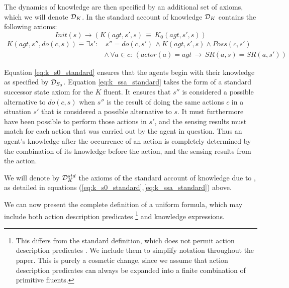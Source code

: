 The dynamics of knowledge are then specified by an additional set
of axioms, which we will denote $\mathcal{D}_{K}$. In the standard account
of knowledge $\mathcal{D}_{K}$ contains the following axioms:\begin{equation}
Init(s)\rightarrow\left(K(agt,s',s)\,\equiv\, K_{0}(agt,s',s)\right)\label{eq:k_s0_standard}\end{equation}
 \begin{align}
K(agt,s'',do(c,s))\equiv\exists s': & \, s''=do(c,s')\,\wedge K(agt,s',s)\wedge Poss(c,s')\nonumber \\
 & \wedge\,\forall a\in c:\,\left(actor(a)=agt\,\rightarrow\, SR(a,s)=SR(a,s')\right)\label{eq:k_ssa_standard}\end{align}


Equation \eqref{eq:k_s0_standard} ensures that the agents begin with
their knowledge as specified by $\mathcal{D}_{S_{0}}$. Equation \eqref{eq:k_ssa_standard}
takes the form of a standard successor state axiom for the $K$ fluent.
It ensures that $s''$ is considered a possible alternative to $do(c,s)$
when $s''$ is the result of doing the same actions $c$ in a situation
$s'$ that is considered a possible alternative to $s$. It must furthermore
have been possible to perform those actions in $s'$, and the sensing
results must match for each action that was carried out by the agent
in question. Thus an agent's knowledge after the occurrence of an
action is completely determined by the combination of its knowledge
before the action, and the sensing results from the action.

\medskip{}


\begin{defn}
We will denote by $\mathcal{D}_{K}^{std}$ the axioms of the standard account
of knowledge due to \citet{scherl03sc_knowledge}, as detailed in
equations (\ref{eq:k_s0_standard},\ref{eq:k_ssa_standard}) above. 
\end{defn}
We can now present the complete definition of a uniform formula, which
may include both action description predicates%
\footnote{This differs from the standard definition, which does not permit action
description predicates \citet{pirri99contributions_sitcalc}. We include
them to simplify notation throughout the paper. This is purely a cosmetic
change, since we assume that action description predicates can always
be expanded into a finite combination of primitive fluents.%
} and knowledge expressions.

